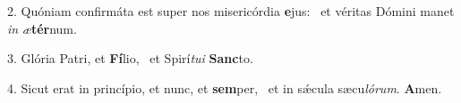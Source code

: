 2. Quóniam confirmáta est super nos misericórdia \textbf{e}jus: \ast\  et véritas Dómini manet \textit{in} \textit{æ}\textbf{tér}num.\

3. Glória Patri, et \textbf{Fí}lio, \ast\  et Spirí\textit{tu}\textit{i} \textbf{Sanc}to.\

4. Sicut erat in princípio, et nunc, et \textbf{sem}per, \ast\  et in sǽcula sæcu\textit{ló}\textit{rum}. \textbf{A}men.\

